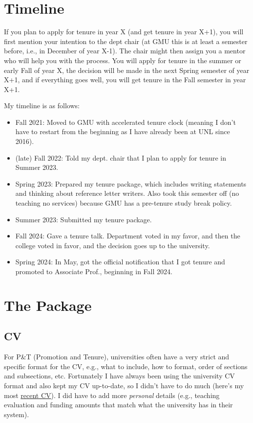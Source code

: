 \documentclass[oneside,11pt,dvipsnames]{book}
\begin{document}
\section{Timeline}

If you plan to apply for tenure in year X (and get tenure in year X+1), you will first mention your intention to the dept chair (at GMU this is at least a semester before, i.e., in December of year X-1). The chair might then assign you a mentor who will help you with the process. You will apply for tenure in the summer or early Fall of year X, the decision will be made in the next Spring semester of year X+1, and if everything goes well, you will get tenure in the Fall semester in year X+1.

My timeline is as follows:

\begin{itemize}
  \item Fall 2021: Moved to GMU with accelerated tenure clock (meaning I don't have to restart from the beginning as I have already been at UNL since 2016).
  \item (late) Fall 2022: Told my dept. chair that I plan to apply for tenure in Summer 2023.
  \item Spring 2023: Prepared my tenure package, which includes writing statements and thinking about reference letter writers.  Also took this semester off (no teaching no services) because GMU has a pre-tenure study break policy.
  \item Summer 2023: Submitted my tenure package.
  \item Fall 2024: Gave a tenure talk. Department voted in my favor, and then the college voted in favor, and the decision goes up to the university.
  \item Spring 2024: In May, got the official notification that I got tenure and promoted to Associate Prof., beginning in Fall 2024.
\end{itemize}

\section{The Package}

\subsection{CV}

For P\&T (Promotion and Tenure), universities often have a very strict and specific format for the CV, e.g., what to include, how to format, order of sections and subsections, etc.  
Fortunately I have always been using the university CV format and also kept my CV up-to-date, so I didn't have to do much (here's my most \href{https://dynaroars.github.io/people/nguyenthanhvuh/latex-cv/cv-nguyen.pdf}{recent CV}). 
I did have to add more \emph{personal} details (e.g., teaching evaluation and funding amounts that match what the university has in their system). 
\end{document}
